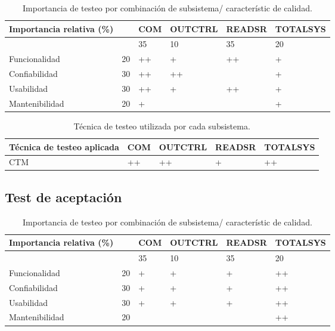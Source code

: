 \documentclass[12pt,a4paper, twosite]{article}
\begin{document}
\begin{table}[ht]
    \centering
    \begin{tabular}{|l|l|l|l|l|l|}\hline \hline
        Importancia relativa (\%) &    & COM & OUTCTRL & READSR & TOTALSYS \\
        \hline

                                  &    & 35  & 10      & 35     & 20       \\
        Funcionalidad             & 20 & ++  & +       & ++     & +        \\
        Confiabilidad             & 30 & ++  & ++      &        & +        \\
        Usabilidad                & 30 & ++  & +       & ++     & +        \\
        Mantenibilidad            & 20 & +   &         &        & +        \\
        \hline
    \end{tabular}
    \caption{Importancia de testeo por combinación de subsistema/ característic
        de calidad.}
\end{table}

\begin{table}[ht]
    \centering
    \begin{tabular}{|l|l|l|l|l|}\hline \hline
        Técnica de testeo aplicada & COM & OUTCTRL & READSR & TOTALSYS \\
        \hline
        CTM                        & ++  & ++      & +      & ++       \\
        \hline
    \end{tabular}
    \caption{Técnica de testeo utilizada por cada subsistema.}
\end{table}

\subsection{Test de aceptación}

\begin{table}[ht]
    \centering
    \begin{tabular}{|l|l|l|l|l|l|}\hline \hline
        Importancia relativa (\%) &    & COM & OUTCTRL & READSR & TOTALSYS \\
        \hline

                                  &    & 35  & 10      & 35     & 20       \\
        Funcionalidad             & 20 & +   & +       & +      & ++       \\
        Confiabilidad             & 30 & +   & +       & +      & ++       \\
        Usabilidad                & 30 & +   & +       & +      & ++       \\
        Mantenibilidad            & 20 &     &         &        & ++       \\
        \hline
    \end{tabular}
    \caption{Importancia de testeo por combinación de subsistema/ característic
        de calidad.}
\end{table}
\end{document}
